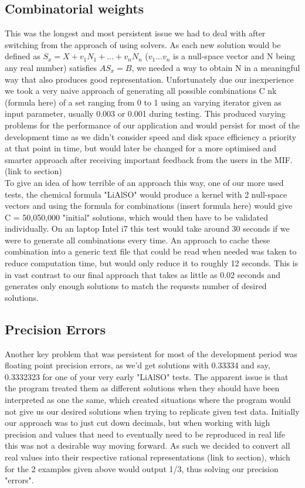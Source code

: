 \subsection*{Combinatorial weights}
This was the longest and most persistent issue we had to deal with after switching from the approach of using solvers. As each new solution would be defined as $S_{x} = X + v_{1}N_{1} + ... + v_{n}N_{n}$ ($v_{1} ... v_{n}$ is a null-space vector and N being any real number) satisfies $AS_{x} = B$, we needed a way to obtain N in a meaningful way that also produces good representation. Unfortunately due our inexperience we took a very naive approach of generating all possible combinations C nk (formula here) of a set ranging from 0 to 1 using an varying iterator given as input parameter, usually 0.003 or 0.001 during testing. This produced varying problems for the performance of our application and would persist for most of the development time as we didn't consider speed and disk space efficiency a priority at that point in time, but would later be changed for a more optimised and smarter approach after receiving important feedback from the users in the MIF. (link to section) \\

To give an idea of how terrible of an approach this way, one of our more used tests, the chemical formula "LiAlSO" would produce a kernel with 2 null-space vectors and using the formula for combinations (insert formula here) would give C = 50,050,000 "initial" solutions, which would then have to be validated individually. On an laptop Intel i7 this test would take around 30 seconds if we were to generate all combinations every time. An approach to cache these combination into a generic text file that could be read when needed was taken to reduce computation time, but would only reduce it to roughly 12 seconds. This is in vast contrast to our final approach that takes as little as 0.02 seconds and generates only enough solutions to match the requests number of desired solutions. \\

\subsection*{Precision Errors}
Another key problem that was persistent for most of the development period was floating point precision errors, as we'd get solutions with 0.33334 and say, 0.3332323 for one of your very early "LiAlSO" tests. The apparent issue is that the program treated them as different solutions when they should have been interpreted as one the same, which created situations where the program would not give us our desired solutions when trying to replicate given test data. Initially our approach was to just cut down decimals, but when working with high precision and values that need to eventually need to be reproduced in real life this was not a desirable way moving forward. As such we decided to convert all real values into their respective rational representations (link to section), which for the 2 examples given above would output 1/3, thus solving our precision "errors".


